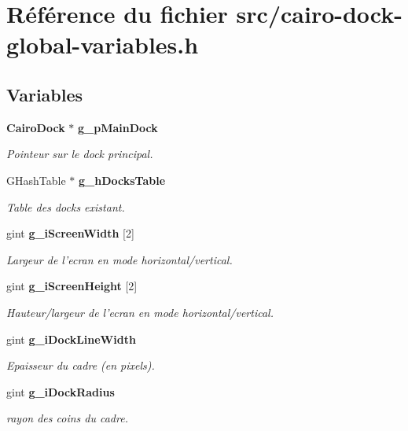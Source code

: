 \section{Référence du fichier src/cairo-dock-global-variables.h}
\label{cairo-dock-global-variables_8h}
\subsection*{Variables}
\begin{CompactItemize}
\item 
{\bf CairoDock} $\ast$ {\bf g\_\-pMainDock}
\begin{CompactList}\small\item\em Pointeur sur le dock principal. \item\end{CompactList}\item 
GHashTable $\ast$ {\bf g\_\-hDocksTable}
\begin{CompactList}\small\item\em Table des docks existant. \item\end{CompactList}\item 
gint {\bf g\_\-iScreenWidth} [2]
\begin{CompactList}\small\item\em Largeur de l'ecran en mode horizontal/vertical. \item\end{CompactList}\item 
gint {\bf g\_\-iScreenHeight} [2]
\begin{CompactList}\small\item\em Hauteur/largeur de l'ecran en mode horizontal/vertical. \item\end{CompactList}\item 
gint {\bf g\_\-iDockLineWidth}
\begin{CompactList}\small\item\em Epaisseur du cadre (en pixels). \item\end{CompactList}\item 
gint {\bf g\_\-iDockRadius}
\begin{CompactList}\small\item\em rayon des coins du cadre. \item\end{CompactList}\item 

\end{CompactItemize}
